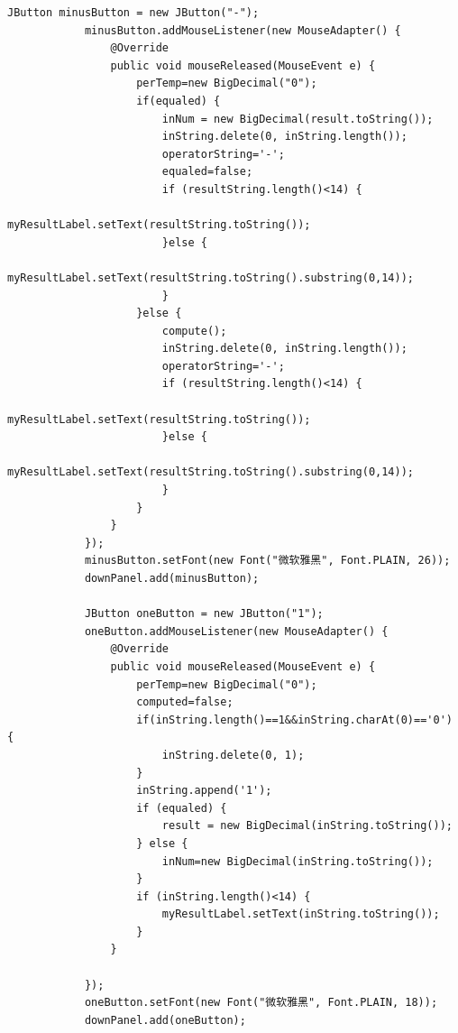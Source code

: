 \documentclass{ctexart}
\begin{document}
\begin{lstlisting}[caption=冗杂的代码]
            JButton minusButton = new JButton("-");
            minusButton.addMouseListener(new MouseAdapter() {
                @Override
                public void mouseReleased(MouseEvent e) {
                    perTemp=new BigDecimal("0");
                    if(equaled) {
                        inNum = new BigDecimal(result.toString());
                        inString.delete(0, inString.length());
                        operatorString='-';
                        equaled=false;
                        if (resultString.length()<14) {
                            myResultLabel.setText(resultString.toString());
                        }else {
                            myResultLabel.setText(resultString.toString().substring(0,14));
                        }
                    }else {
                        compute();
                        inString.delete(0, inString.length());
                        operatorString='-';
                        if (resultString.length()<14) {
                            myResultLabel.setText(resultString.toString());
                        }else {
                            myResultLabel.setText(resultString.toString().substring(0,14));
                        }
                    }
                }
            });
            minusButton.setFont(new Font("微软雅黑", Font.PLAIN, 26));
            downPanel.add(minusButton);
            
            JButton oneButton = new JButton("1");
            oneButton.addMouseListener(new MouseAdapter() {
                @Override
                public void mouseReleased(MouseEvent e) {
                    perTemp=new BigDecimal("0");
                    computed=false;
                    if(inString.length()==1&&inString.charAt(0)=='0') {
                        inString.delete(0, 1);
                    }
                    inString.append('1');
                    if (equaled) {
                        result = new BigDecimal(inString.toString());		
                    } else {
                        inNum=new BigDecimal(inString.toString());
                    }
                    if (inString.length()<14) {
                        myResultLabel.setText(inString.toString());
                    }
                }
            
            });
            oneButton.setFont(new Font("微软雅黑", Font.PLAIN, 18));
            downPanel.add(oneButton);
            

\end{lstlisting}
\end{document}
